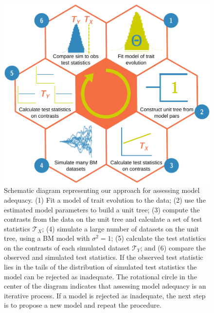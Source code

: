 \documentclass[a4paper,11pt]{article}
\begin{document}
{\begin{figure}[p]
  \centering
  \includegraphics[scale=0.85]{figs/flow-diagram}
  \caption{Schematic diagram representing our approach for assessing model adequacy. (1) Fit a model of trait evolution to the data; (2) use the estimated model parameters to build a unit tree; (3) compute the contrasts from the data on the unit tree and calculate a set of test statistics $\mathcal{T}_X$; (4) simulate a large number of datasets on the unit tree, using a BM model with $\sigma^2= 1$; (5) calculate the test statistics on the contrasts of each simulated dataset $\mathcal{T}_Y$; and (6) compare the observed and simulated test statistics. If the observed test statistic lies in the tails of the distribution of simulated test statistics the model can be rejected as inadequate. The rotational circle in the center of the diagram indicates that assessing model adequacy is an iterative process. If a model is rejected as inadequate, the next step is to propose a new model and repeat the procedure.}
  \label{fig:flowchart}
\end{figure}


}
\end{document}
